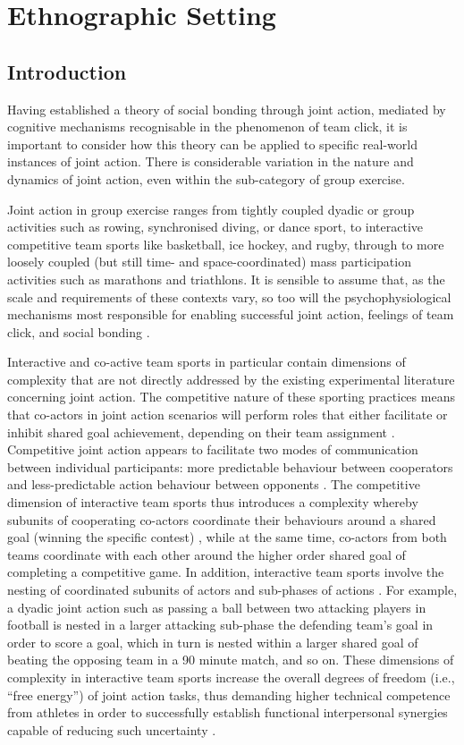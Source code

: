 \chapter{\label{ethnographicSetting}Ethnographic Setting}

\section{Introduction}
    Having established a theory of social bonding through joint action, mediated by cognitive mechanisms recognisable in the phenomenon of team click, it is important to consider how this theory can be applied to specific real-world instances of joint action. There is considerable variation in the nature and dynamics of joint action, even within the sub-category of group exercise.

Joint action in group exercise ranges from tightly coupled dyadic or group activities such as rowing, synchronised diving, or dance sport, to interactive competitive team sports like basketball, ice hockey, and rugby, through to more loosely coupled (but still time- and space-coordinated) mass participation activities such as marathons and triathlons.  It is sensible to assume that, as the scale and requirements of these contexts vary, so too will the psychophysiological mechanisms most responsible for enabling successful joint action, feelings of team click, and social bonding \citep{Mogan2017,Launay2016}.

Interactive and co-active team sports in particular contain dimensions of complexity that are not directly addressed by the existing experimental literature concerning joint action.  The competitive nature of these sporting practices means that co-actors in joint action scenarios will perform roles that either facilitate or inhibit shared goal achievement, depending on their team assignment \citep{Renshaw2009}. Competitive joint action appears to facilitate two modes of communication between individual participants: more predictable behaviour between cooperators and less-predictable action behaviour between opponents \citep{Glover2017}. The competitive dimension of interactive team sports thus introduces a complexity whereby subunits of cooperating co-actors coordinate their behaviours around a shared goal (winning the specific contest) \citep{Passos2012}, while at the same time, co-actors from both teams coordinate with each other around the higher order shared goal of completing a competitive game.
In addition, interactive team sports involve the nesting of coordinated subunits of actors and sub-phases of actions \citep{Vilar2012}.  For example, a dyadic joint action such as passing a ball between two attacking players in football is nested in a larger attacking sub-phase the defending team's goal in order to score a goal, which in turn is nested within a larger shared goal of beating the opposing team in a 90 minute match, and so on.  These dimensions of complexity in interactive team sports increase the overall degrees of freedom (i.e., ``free energy'') of joint action tasks, thus demanding higher technical competence from athletes in order to successfully establish functional interpersonal synergies capable of reducing such uncertainty \citep{Duarte2012}.

